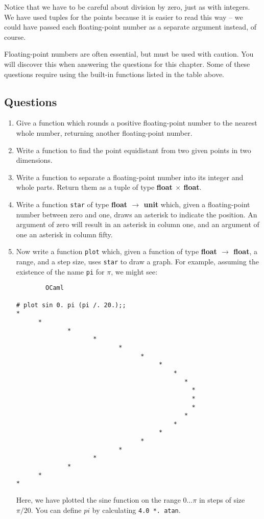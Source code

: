 \documentclass[]{book}
\begin{document}
\noindent Notice that we have to be careful about division by zero, just as with integers. We have used tuples for the points because it is easier to read this way -- we could have passed each floating-point number as a separate argument instead, of course.

Floating-point numbers are often essential, but must be used with caution. You will discover this when answering the questions for this chapter. Some of these questions require using the built-in functions listed in the table above.

\clearpage
\subsection*{Questions}
\begin{enumerate}
\item Give a function which rounds a positive floating-point number to the nearest whole number, returning another floating-point number.

\item Write a function to find the point equidistant from two given points in two dimensions.

\item Write a function to separate a floating-point number into its integer and whole parts. Return them as a tuple of type \textsf{\textbf{float $\times$ float}}.

\item Write a function \texttt{star} of type \textsf{\textbf{float $\rightarrow$ unit}} which, given a floating-point number between zero and one, draws an asterisk to indicate the position. An argument of zero will result in an asterisk in column one, and an argument of one an asterisk in column fifty.

\item Now write a function \texttt{plot} which, given a function of type \textsf{\textbf{float $\rightarrow$ float}}, a range, and a step size, uses \texttt{star} to draw a graph. For example, assuming the existence of the name \texttt{pi} for $\pi$, we might see:

\begin{verbatim}
        OCaml

# plot sin 0. pi (pi /. 20.);;
*
      *
              *
                     *
                            *
                                  *
                                       *
                                           *
                                              *
                                                *
                                                *
                                                *
                                              *
                                           *
                                       *
                                  *
                            *
                     *
              *
      *
*
\end{verbatim}


\noindent Here, we have plotted the sine function on the range $0\ldots\pi$ in steps of size $\pi / 20$. You can define $pi$ by calculating \texttt{4.0\! *.\ \!atan}.
\end{enumerate}
\end{document}
